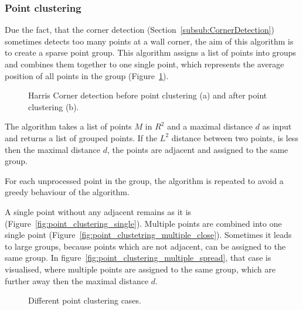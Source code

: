\subsubsection{Point clustering}
Due the fact, that the corner detection (Section~\ref{subsub:CornerDetection}) sometimes detects too many points at a wall corner, the aim of this algorithm is to create a sparse point group. This algorithm assigns a list of points into groups and combines them together to one single point, which represents the average position of all points in the group (Figure~\ref{fig:HCPointClustering}).

\begin{figure}[h!]
	\centering
	\hfill
	\caption{Harris Corner detection before point clustering (a) and after point clustering (b).}
	\label{fig:HCPointClustering}
\end{figure}

The algorithm takes a list of points $M$ in $R^2$ and a maximal distance $d$ as input and returns a list of grouped points. If the $L^2$ distance between two points, is less then the maximal distance $d$, the points are adjacent and assigned to the same group.

For each unprocessed point in the group, the algorithm is repeated to avoid a greedy behaviour of the algorithm.

A single point without any adjacent remains as it is (Figure~\ref{fig:point_clustering_single}). Multiple points are combined into one single point (Figure~\ref{fig:point_clustetring_multiple_close}). Sometimes it leads to large groups, because points which are not adjacent, can be assigned to the same group. In figure~\ref{fig:point_clustering_multiple_spread}, that case is visualised, where multiple points are assigned to the same group, which are further away then the maximal distance $d$.

\begin{figure}[h!]
	\centering
	\hfill
	\hfill
	\caption{Different point clustering cases.}
	\label{fig:PointClusteringCases}
\end{figure}

